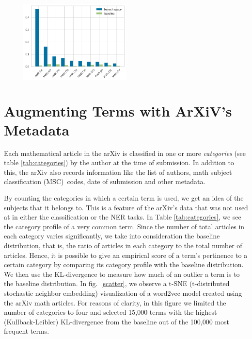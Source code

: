 \documentclass[11pt,a4paper]{article}
\begin{document}
\begin{figure}[h!]
    \includegraphics[width=0.5\textwidth]{images/barcomp.png}
\end{figure}

\section{Augmenting Terms with ArXiV's Metadata}
Each mathematical article in the arXiv is classified in one or more
\emph{categories} (see table \ref{tab:categories}) by the author at
the time of submission. In addition
to this, the arXiv also records information like the list of authors, math subject classification (MSC)~codes, date of submission and 
other metadata. 

By counting the categories in which a certain term is used, we get an
idea of the subjects that it belongs to. This is a feature of the arXiv's data that was not used at in either the classification or the NER tasks. In Table
\ref{tab:categories}, we see the category profile of a very common
term. Since the number of total articles in each category varies
significantly, we take into consideration the baseline distribution,
that is, the ratio of articles in each category to the total number of
articles.
Hence, it is possible to give an empirical score of a term's
pertinence to a certain category by comparing its category profile
with the baseline distribution. We then use the KL-divergence
to measure how much of an outlier a term is to the baseline
distribution.
In fig.~\ref{scatter}, we observe a t-SNE (t-distributed stochastic
neighbor embedding) visualization of a word2vec 
model created using the arXiv math articles. For reasons of clarity,
in this figure we limited the number of categories to four and selected
15,000 terms with the highest (Kullback-Leibler) KL-divergence from the baseline out of the 100,000 most frequent terms. 
\end{document}
